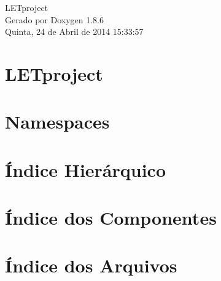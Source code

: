 \documentclass[twoside]{book}
\newcommand{\clearemptydoublepage}{%
  \newpage{\pagestyle{empty}\cleardoublepage}%
}
\begin{document}
\hypersetup{pageanchor=false}
\begin{titlepage}
\vspace*{7cm}
\begin{center}%
{\Large L\-E\-Tproject }\\
\vspace*{1cm}
{\large Gerado por Doxygen 1.8.6}\\
\vspace*{0.5cm}
{\small Quinta, 24 de Abril de 2014 15:33:57}\\
\end{center}
\end{titlepage}
\clearemptydoublepage
\tableofcontents
\clearemptydoublepage
{}
\hypersetup{pageanchor=true}

\chapter{L\-E\-Tproject}
\label{d0/d30/md_README}
\hypertarget{d0/d30/md_README}{}

\chapter{Namespaces}

\chapter{Índice Hierárquico}

\chapter{Índice dos Componentes}

\chapter{Índice dos Arquivos}

\end{document}
